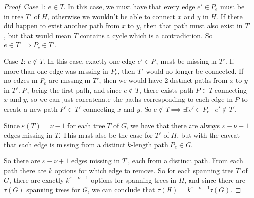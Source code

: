 \documentclass[11pt]{article}
\newcommand{\n}{\vspace{0.3cm}}
\begin{document}
\begin{itemize}
\begin{enumerate}[label=(\alph*)]
\begin{proof}
          Case 1: \(e \in T\).  In this case, we must have that every edge \(e' \in P_e\) must be in tree \(T'\) of \(H\), otherwise we wouldn't be able to connect \(x\) and \(y\) in \(H\).  If there did happen to exist another path from \(x\) to \(y\), then that path must also exist in \(T\), but that would mean \(T\) contains a cycle which is a contradiction.  So \(e \in T \implies P_e \in T'\). \n

          Case 2: \(e \not\in T\).  In this case, exactly one edge \(e' \in P_e\) must be missing in \(T'\).  If more than one edge was missing in \(P_e\), then \(T'\) would no longer be connected.  If no edges in \(P_e\) are missing in \(T'\), then we would have 2 distinct paths from \(x\) to \(y\) in \(T'\).  \(P_e\) being the first path, and since \(e \not\in T\), there exists path \(P \in T\) connecting \(x\) and \(y\), so we can just concatenate the paths corresponding to each edge in \(P\) to create a new path \(P' \in T'\) connecting \(x\) and \(y\).  So \(e \not\in T \implies \exists! e' \in P_e \mid e' \not\in T'\). \n

          Since \(\varepsilon(T) = \nu - 1\) for each tree \(T\) of \(G\), we have that there are always \(\varepsilon - \nu + 1\) edges missing in \(T\).  This must also be the case for \(T'\) of \(H\), but with the caveat that each edge is missing from a distinct \(k\)-length path \(P_e \in G\). \n

          So there are \(\varepsilon - \nu + 1\) edges missing in \(T'\), each from a distinct path.  From each path there are \(k\) options for which edge to remove.  So for each spanning tree \(T\) of \(G\), there are exactly \(k^{\varepsilon - \nu + 1}\) options for spanning trees in \(H\), and since there are \(\tau(G)\) spanning trees for \(G\), we can conclude that \(\tau(H) = k^{\varepsilon - \nu + 1} \tau(G)\).
        \end{proof}
        


\end{enumerate}
\end{itemize}
\end{document}
